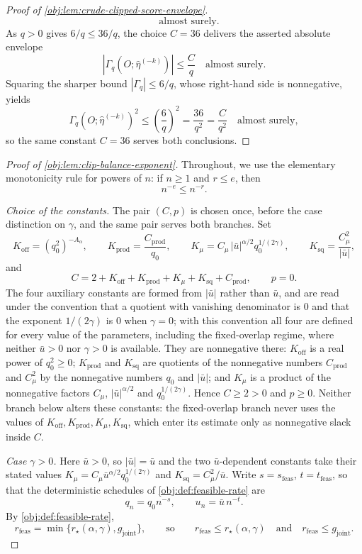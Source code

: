 \documentclass[11pt]{article}
\begin{document}
\begin{proof}[Proof of \cref{obj:lem:crude-clipped-score-envelope}]
\[\quad\text{almost surely}.
\]
As \(q>0\) gives \(6/q\le 36/q\), the choice \(C=36\) delivers the asserted absolute envelope
\[
\left|\Gamma_q\!\left(O;\widehat\eta^{(-k)}\right)\right|\le\frac{C}{q}
\quad\text{almost surely}.
\]
Squaring the sharper bound \(|\Gamma_q|\le 6/q\), whose right-hand side is nonnegative, yields
\[
\Gamma_q\!\left(O;\widehat\eta^{(-k)}\right)^2\le \left(\frac{6}{q}\right)^2=\frac{36}{q^2}=\frac{C}{q^2}
\quad\text{almost surely},
\]
so the same constant \(C=36\) serves both conclusions. %
\end{proof}

\begin{proof}[Proof of \cref{obj:lem:clip-balance-exponent}]
Throughout, we use the elementary monotonicity rule for powers of \(n\): if \(n\ge 1\) and \(r\le e\), then
\[
n^{-e}\le n^{-r}.
\]

\emph{Choice of the constants.}  The pair \((C,p)\) is chosen once, before the case distinction on \(\gamma\), and the same pair serves both branches.  Set
\[
K_{\mathrm{off}}=(q_0^2)^{-A_\alpha},
\qquad
K_{\mathrm{prod}}=\frac{C_{\mathrm{prod}}}{q_0},
\qquad
K_\mu=C_\mu\,|\bar u|^{\alpha/2}q_0^{1/(2\gamma)},
\qquad
K_{\mathrm{sq}}=\frac{C_\mu^2}{|\bar u|},
\]
and
\[
C=2+K_{\mathrm{off}}+K_{\mathrm{prod}}+K_\mu+K_{\mathrm{sq}}+C_{\mathrm{prod}},
\qquad
p=0 .
\]
The four auxiliary constants are formed from \(|\bar u|\) rather than \(\bar u\), and are read under the convention that a quotient with vanishing denominator is \(0\) and that the exponent \(1/(2\gamma)\) is \(0\) when \(\gamma=0\); with this convention all four are defined for every value of the parameters, including the fixed-overlap regime, where neither \(\bar u>0\) nor \(\gamma>0\) is available.  They are nonnegative there: \(K_{\mathrm{off}}\) is a real power of \(q_0^2\ge0\); \(K_{\mathrm{prod}}\) and \(K_{\mathrm{sq}}\) are quotients of the nonnegative numbers \(C_{\mathrm{prod}}\) and \(C_\mu^2\) by the nonnegative numbers \(q_0\) and \(|\bar u|\); and \(K_\mu\) is a product of the nonnegative factors \(C_\mu\), \(|\bar u|^{\alpha/2}\) and \(q_0^{1/(2\gamma)}\).  Hence \(C\ge2>0\) and \(p\ge0\).  Neither branch below alters these constants: the fixed-overlap branch never uses the values of \(K_{\mathrm{off}},K_{\mathrm{prod}},K_\mu,K_{\mathrm{sq}}\), which enter its estimate only as nonnegative slack inside \(C\). %

\emph{Case \(\gamma>0\).}  Here \(\bar u>0\), so \(|\bar u|=\bar u\) and the two \(\bar u\)-dependent constants take their stated values \(K_\mu=C_\mu\bar u^{\alpha/2}q_0^{1/(2\gamma)}\) and \(K_{\mathrm{sq}}=C_\mu^2/\bar u\).  Write \(s=s_{\mathrm{feas}}\), \(t=t_{\mathrm{feas}}\), so that the deterministic schedules of \cref{obj:def:feasible-rate} are
\[
q_n=q_0n^{-s},
\qquad
u_n=\bar u\,n^{-t}.
\]
By \cref{obj:def:feasible-rate},
\[
r_{\mathrm{feas}}=\min\{r_\star(\alpha,\gamma),g_{\mathrm{joint}}\},
\qquad\text{so}\qquad
r_{\mathrm{feas}}\le r_\star(\alpha,\gamma)
\quad\text{and}\quad
r_{\mathrm{feas}}\le g_{\mathrm{joint}} .
\]


\end{proof}
\end{document}
